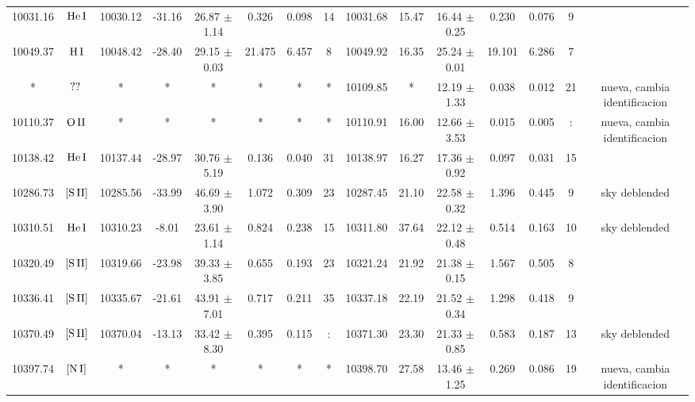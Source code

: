 \documentclass{article}
\begin{document}
\begin{table*}
\begin{adjustbox}{width=\textwidth}
\begin{tabular}{ccccccccccccccc}
10031.16 & $\mbox{He}\thinspace \mbox{I}$ & 10030.12 & -31.16 & 26.87 $\pm$ 1.14 & 0.326 & 0.098 & 14 & 10031.68 & 15.47 & 16.44 $\pm$ 0.25 & 0.230 & 0.076 & 9 &  \\
10049.37 & $\mbox{H}\thinspace \mbox{I}$ & 10048.42 & -28.40 & 29.15 $\pm$ 0.03 & 21.475 & 6.457 & 8 & 10049.92 & 16.35 & 25.24 $\pm$ 0.01 & 19.101 & 6.286 & 7 &  \\
* & $\mbox{??}\thinspace \mbox{}$ & * & * & * & * & * & * & 10109.85 & * & 12.19 $\pm$ 1.33 & 0.038 & 0.012 & 21 &  nueva, cambia identificacion \\
10110.37 & $\mbox{O}\thinspace \mbox{II}$ & * & * & * & * & * & * & 10110.91 & 16.00 & 12.66 $\pm$ 3.53 & 0.015 & 0.005 & : &  nueva, cambia identificacion \\
10138.42 & $\mbox{He}\thinspace \mbox{I}$ & 10137.44 & -28.97 & 30.76 $\pm$ 5.19 & 0.136 & 0.040 & 31 & 10138.97 & 16.27 & 17.36 $\pm$ 0.92 & 0.097 & 0.031 & 15 &  \\
10286.73 & $\mbox{[S}\thinspace \mbox{II]}$ & 10285.56 & -33.99 & 46.69 $\pm$ 3.90 & 1.072 & 0.309 & 23 & 10287.45 & 21.10 & 22.58 $\pm$ 0.32 & 1.396 & 0.445 & 9 &  sky deblended \\
10310.51 & $\mbox{He}\thinspace \mbox{I}$ & 10310.23 & -8.01 & 23.61 $\pm$ 1.14 & 0.824 & 0.238 & 15 & 10311.80 & 37.64 & 22.12 $\pm$ 0.48 & 0.514 & 0.163 & 10 &  sky deblended \\
10320.49 & $\mbox{[S}\thinspace \mbox{II]}$ & 10319.66 & -23.98 & 39.33 $\pm$ 3.85 & 0.655 & 0.193 & 23 & 10321.24 & 21.92 & 21.38 $\pm$ 0.15 & 1.567 & 0.505 & 8 &  \\
10336.41 & $\mbox{[S}\thinspace \mbox{II]}$ & 10335.67 & -21.61 & 43.91 $\pm$ 7.01 & 0.717 & 0.211 & 35 & 10337.18 & 22.19 & 21.52 $\pm$ 0.34 & 1.298 & 0.418 & 9 &  \\
10370.49 & $\mbox{[S}\thinspace \mbox{II]}$ & 10370.04 & -13.13 & 33.42 $\pm$ 8.30 & 0.395 & 0.115 & : & 10371.30 & 23.30 & 21.33 $\pm$ 0.85 & 0.583 & 0.187 & 13 &  sky deblended \\
10397.74 & $\mbox{[N}\thinspace \mbox{I]}$ & * & * & * & * & * & * & 10398.70 & 27.58 & 13.46 $\pm$ 1.25 & 0.269 & 0.086 & 19 &  nueva, cambia identificacion \\
\hline
\end{tabular}
\end{adjustbox}
\end{table*}
\end{document}
